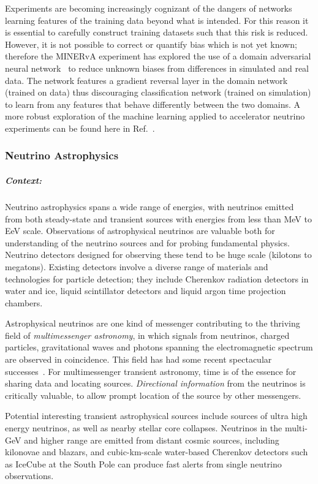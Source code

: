 Experiments are becoming increasingly cognizant of the dangers of networks learning features of the training data beyond what is intended. For this reason it is essential to carefully construct training datasets such that this risk is reduced. 
However, it is not possible to correct or quantify bias which is not yet known; therefore the MINERvA experiment has explored the use of a domain adversarial neural network~\cite{Perdue_2018} to reduce unknown biases from differences in simulated and real data. 
The network features a gradient reversal layer in the domain network (trained on data) thus  discouraging classification network (trained on simulation) to learn from any features that behave differently between the two domains. 
A more robust exploration of the machine learning applied to accelerator neutrino experiments can be found here in Ref.~\cite{Psihas_2020}.

\subsubsection{Neutrino Astrophysics} \label{sec:nu_astro}

\subparagraph*{Context:} Neutrino astrophysics spans a wide range of energies, with neutrinos emitted from both steady-state and transient sources with energies from less than MeV to EeV scale.  
Observations of astrophysical neutrinos are valuable both for understanding of the neutrino sources and for probing fundamental physics.  
Neutrino detectors designed for observing these tend to be huge scale (kilotons to megatons).  
Existing detectors involve a diverse range of materials and technologies for particle detection; they include Cherenkov radiation detectors in water and ice, liquid scintillator detectors and liquid argon time projection chambers.
  
Astrophysical neutrinos are one kind of messenger contributing to the thriving field of \textit{multimessenger astronomy}, in which signals from neutrinos, charged particles, gravitational waves and photons spanning the electromagnetic spectrum are observed in coincidence.  
This field has had some recent spectacular successes~\cite{Abbott_2017,AaAc2018,GrFo2020}.  For multimessenger transient astronomy, time is of the essence for sharing data and locating sources.  
\textit{Directional information} from the neutrinos is critically valuable, to allow prompt location of the source by other messengers.

Potential interesting transient astrophysical sources include sources of ultra high energy neutrinos, as well as nearby stellar core collapses.   
Neutrinos in the multi-GeV and higher range are emitted from distant cosmic sources, including kilonovae and blazars, and cubic-km-scale water-based Cherenkov detectors such as IceCube at the South Pole can produce fast alerts from  single neutrino observations.

